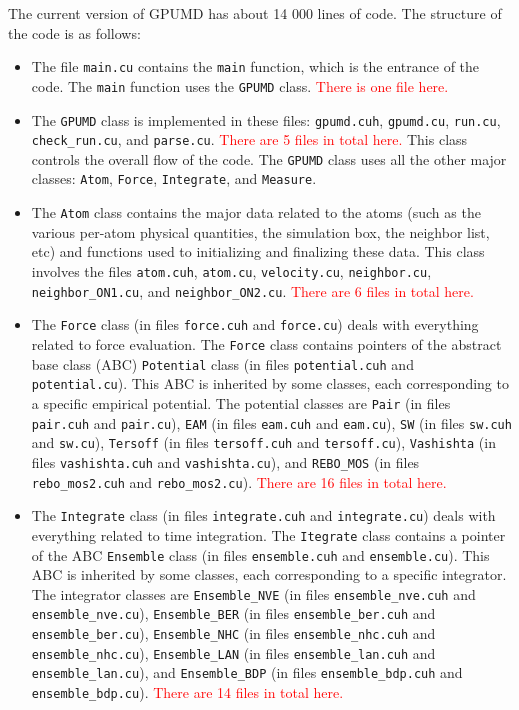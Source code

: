 \documentclass[12pt,a4paper]{report}
\begin{document}
The current version of GPUMD has about 14 000 lines of code. The structure of the code is as follows:
\begin{itemize}
\item The file \verb"main.cu" contains the \verb"main" function, which is the entrance of the code. The \verb"main" function uses the \verb"GPUMD" class. \textcolor{red}{There is one file here.}


\item The \verb"GPUMD" class is implemented in these files: \verb"gpumd.cuh", \verb"gpumd.cu", \verb"run.cu", \verb"check_run.cu", and \verb"parse.cu". \textcolor{red}{There are 5 files in total here.} This class controls the overall flow of the code. The \verb"GPUMD" class uses all the other major classes: \verb"Atom", \verb"Force", \verb"Integrate", and \verb"Measure". 

\item The \verb"Atom" class contains the major data related to the atoms (such as the various per-atom physical quantities, the simulation box, the neighbor list, etc) and functions used to initializing and finalizing these data. This class involves the files \verb"atom.cuh", \verb"atom.cu", \verb"velocity.cu", \verb"neighbor.cu", \verb"neighbor_ON1.cu", and \verb"neighbor_ON2.cu". \textcolor{red}{There are 6 files in total here.}

\item The \verb"Force" class (in files \verb"force.cuh" and \verb"force.cu") deals with everything related to force evaluation. The \verb"Force" class contains pointers of the abstract base class (ABC) \verb"Potential" class (in files \verb"potential.cuh" and \verb"potential.cu"). This ABC is inherited by some classes, each corresponding to a specific empirical potential. The potential classes are \verb"Pair" (in files \verb"pair.cuh" and \verb"pair.cu"), \verb"EAM" (in files \verb"eam.cuh" and \verb"eam.cu"), \verb"SW" (in files \verb"sw.cuh" and \verb"sw.cu"), \verb"Tersoff" (in files \verb"tersoff.cuh" and \verb"tersoff.cu"), \verb"Vashishta" (in files \verb"vashishta.cuh" and \verb"vashishta.cu"), and \verb"REBO_MOS" (in files \verb"rebo_mos2.cuh" and \verb"rebo_mos2.cu"). \textcolor{red}{There are 16 files in total here.}

\item The \verb"Integrate" class (in files \verb"integrate.cuh" and \verb"integrate.cu") deals with everything related to time integration. The \verb"Itegrate" class contains a pointer of the ABC \verb"Ensemble" class (in files \verb"ensemble.cuh" and \verb"ensemble.cu"). This ABC is inherited by some classes, each corresponding to a specific integrator. The integrator classes are \verb"Ensemble_NVE" (in files \verb"ensemble_nve.cuh" and \verb"ensemble_nve.cu"), \verb"Ensemble_BER" (in files \verb"ensemble_ber.cuh" and \verb"ensemble_ber.cu"), \verb"Ensemble_NHC" (in files \verb"ensemble_nhc.cuh" and \verb"ensemble_nhc.cu"), \verb"Ensemble_LAN" (in files \verb"ensemble_lan.cuh" and \verb"ensemble_lan.cu"), and \verb"Ensemble_BDP" (in files \verb"ensemble_bdp.cuh" and \verb"ensemble_bdp.cu").  \textcolor{red}{There are 14 files in total here.}


\end{itemize}
\end{document}
